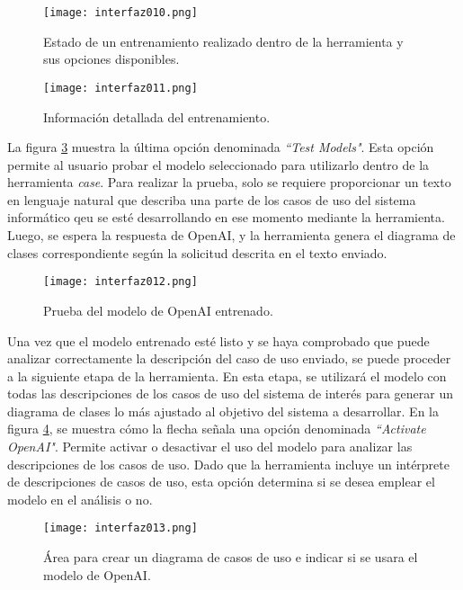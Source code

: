 \begin{figure}[H]  
	\centering
	\texttt{[image: interfaz010.png]} 
	\caption{Estado de un entrenamiento realizado dentro de la herramienta y sus opciones disponibles.}
	\label{fig:cap3_interfaz_010}
\end{figure} 

\begin{figure}[H]  
	\centering
	\texttt{[image: interfaz011.png]} 
	\caption{Información detallada del entrenamiento.}
	\label{fig:cap3_interfaz_011}
\end{figure}

La figura \ref{fig:cap3_interfaz_012} muestra la última opción denominada \textit{``Test Models"}. Esta opción permite al usuario probar el modelo seleccionado para utilizarlo dentro de la herramienta \textit{case}. Para realizar la prueba, solo se requiere proporcionar un texto en lenguaje natural que describa una parte de los casos de uso del sistema informático qeu se esté desarrollando en ese momento mediante la herramienta. Luego, se espera la respuesta de OpenAI, y la herramienta genera el diagrama de clases correspondiente según la solicitud descrita en el texto enviado.
 
 \begin{figure}[H]  
 	\centering
 	\texttt{[image: interfaz012.png]} 
 	\caption{Prueba del modelo de OpenAI entrenado.}
 	\label{fig:cap3_interfaz_012}
 \end{figure}

Una vez que el modelo entrenado esté listo y se haya comprobado que puede analizar correctamente la descripción del caso de uso enviado, se puede proceder a la siguiente etapa de la herramienta. En esta etapa, se utilizará el modelo con todas las descripciones de los casos de uso del sistema de interés para generar un diagrama de clases lo más ajustado al objetivo del sistema a desarrollar. En la figura \ref{fig:cap3_interfaz_013}, se muestra cómo la flecha señala una opción denominada \textit{``Activate OpenAI"}. Permite activar o desactivar el uso del modelo para analizar las descripciones de los casos de uso. Dado que la herramienta incluye un intérprete de descripciones de casos de uso, esta opción determina si se desea emplear el modelo en el análisis o no.


 \begin{figure}[H]  
	\centering
	\texttt{[image: interfaz013.png]} 
	\caption{Área para crear un diagrama de casos de uso e indicar si se usara el modelo de OpenAI.}
	\label{fig:cap3_interfaz_013}
\end{figure}

